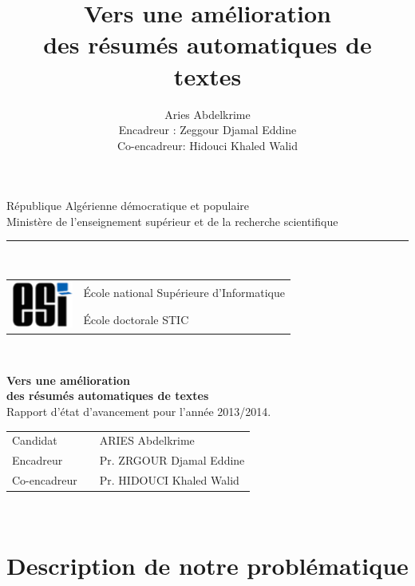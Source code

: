 \documentclass[12pt, oneside, a4paper]{book}
\author{Aries Abdelkrime  \\[5 cm]
Encadreur : Zeggour Djamal Eddine \\
Co-encadreur: Hidouci Khaled Walid
}
\title{Vers une amélioration \\des résumés automatiques de textes}
\begin{document}
\pagestyle{empty} 


\begin{center}
République Algérienne démocratique et populaire\\
Ministère de l'enseignement supérieur et de la recherche scientifique
\end{center}

\begin{center}
\noindent\rule{5 cm}{0.4pt}\\[2 cm]
\end{center}

\noindent
\begin{tabular}{ll}
\multirow{2}{*}{\includegraphics[width=2cm]{img/esi-logo.png}} & \'Ecole national Supérieure d'Informatique\\
& \'Ecole doctorale STIC
\end{tabular}\\[2 cm]

\noindent
\begin{center}
{\LARGE \textbf{Vers une amélioration \\des résumés automatiques de textes}}\\[1 cm]
Rapport d'état d'avancement pour l'année 2013/2014.\\[3 cm]
\end{center}

\noindent
\begin{tabular}{lll}
Candidat& & ARIES Abdelkrime\\
Encadreur&& Pr. ZRGOUR Djamal Eddine \\
Co-encadreur && Pr. HIDOUCI Khaled Walid
\end{tabular}\\[2 cm]

\newpage

\pagestyle{plain}


\chapter{Description de notre problématique}
\end{document}
